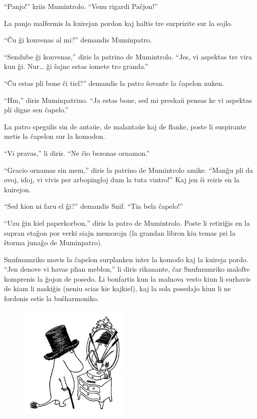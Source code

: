 ``Panjo!'' kriis Mumintrolo. ``Venu rigardi Paĉjon!''

La panjo malfermis la kuirejan pordon kaj haltis tre surprizite sur la sojlo.

``Ĉu ĝi konvenas al mi?'' demandis Muminpatro.

``Sendube ĝi konvenas,'' diris la patrino de Mumintrolo. ``Jes, vi aspektas tre vira kun ĝi. Nur{\ldots} ĝi ŝajne estas iomete tro granda.''

``Ĉu estas pli bone ĉi tiel?'' demandis la patro ŝovante la ĉapelon nuken.

``Hm,'' diris Muminpatrino. ``Ja estas bone, sed mi preskaŭ pensas ke vi aspektas pli digne sen ĉapelo.''

La patro spegulis sin de antaŭe, de malantaŭe kaj de flanke, poste li suspirante metis la ĉapelon sur la komodon.

``Vi pravas,'' li diris. ``Ne ĉio bezonas ornamon.''

``Gracio ornamas sin mem,'' diris la patrino de Mumintrolo amike. ``Manĝu pli da ovoj, idoj, vi vivis per arbopingloj dum la tuta vintro!'' Kaj jen ŝi reiris en la kuirejon.

``Sed kion ni faru el ĝi?'' demandis Snif. ``Tia bela ĉapelo!''

``Uzu ĝin kiel paperkorbon,'' diris la patro de Mumintrolo. Poste li retiriĝis en la supran etaĝon por verki siajn memorojn (la grandan libron kiu temas pri la ŝtorma junaĝo de Muminpatro).

Snufmumriko movis la ĉapelon surplanken inter la komodo kaj la kuireja pordo. ``Jen denove vi havas plian meblon,'' li diris rikanante, ĉar Snufmumriko malofte komprenis la ĝojon de posedo. Li bonfartis kun la malnova vesto kiun li surhavis de kiam li naskiĝis (neniu scias kie kajkiel), kaj la sola posedaĵo kiun li ne fordonis estis la buŝharmoniko.

\begin{figure}[htbp]
\centering
\includegraphics[width=150pt,height=157pt]{_4.jpg}
\caption{}
\label{_4}
\end{figure}

